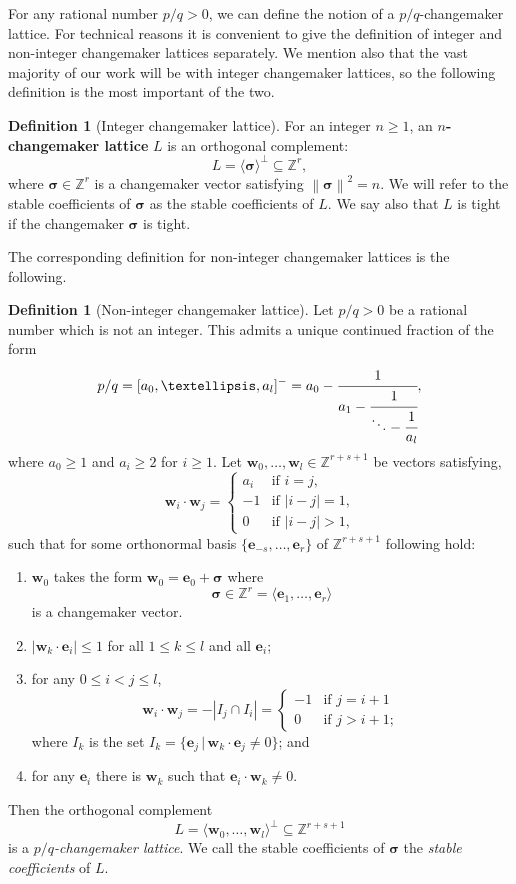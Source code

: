 \documentclass{amsart} %
\newcommand{\Z}{\mathbb{Z}}
\newcommand{\e}{\bm{e}}
\newcommand{\bsigma}{\bm{\sigma}}
\newcommand{\norm}[1]{\left\lVert #1 \right\rVert^2}
\theoremstyle{thm}
\theoremstyle{definition}
\newtheorem{defi}[Theorem]{Definition}
\numberwithin{equation}{section}
\begin{document}
For any rational number $p/q>0$, we can define the notion of a $p/q$-changemaker lattice. For technical reasons it is convenient to give the definition of integer and non-integer changemaker lattices separately. We mention also that the vast majority of our work will be with integer changemaker lattices, so the following definition is the most important of the two.
\begin{defi}[Integer changemaker lattice]\label{def:int_CM_lattice}
For an integer $n\geq 1$, an \textbf{$n$-change\-maker lattice} $L$ is an orthogonal complement:
\[
L=\langle\bsigma\rangle^\bot \subseteq \Z^r,
\]
where $\bsigma\in \Z^r$ is a changemaker vector satisfying $\norm{\bsigma}=n$. We will refer to the stable coefficients of $\bsigma$ as the stable coefficients of $L$. We say also that $L$ is tight if the changemaker $\bsigma$ is tight.
\end{defi}
The corresponding definition for non-integer changemaker lattices is the following.
\begin{defi}[Non-integer changemaker lattice]\label{def:non_int_CM_lattice}
Let $p/q>0$ be a rational number which is not an integer. This admits a unique continued fraction of the form
\[p/q=[a_0, \dots, a_l]^-=
a_0 -
    \cfrac{1}{a_1
        - \cfrac{1}{\ddots
            - \cfrac{1}{a_l} } },\]
where $a_0\geq 1$ and $a_i\geq 2$ for $i\geq 1$. Let $\bm{w}_0, \dots, \bm{w}_l\in \Z^{r+s+1}$ be vectors satisfying,
\[
\bm{w}_i\cdot \bm{w}_j =
\begin{cases}
a_i &\text{if $i=j$,}\\
-1 &\text{if $|i-j|=1$,}\\
0 &\text{if $|i-j|>1$,}
\end{cases}
\]
such that for some orthonormal basis $\{\e_{-s}, \dots, \e_r\}$ of $\Z^{r+s+1}$ following hold:
\begin{enumerate}[label=(\Roman*)]
\item $\bm{w}_0$ takes the form $\bm{w}_0=\e_0+\bsigma$ where
\[
\bsigma\in \Z^r=\langle \e_1, \dots, \e_r\rangle
\]
is a changemaker vector.

\item $|\bm{w}_k\cdot \e_i|\leq 1$ for all $1\leq k\leq l$ and all $\e_i$;
\item for any $0\leq i < j\leq l$,
\[\bm{w}_i\cdot \bm{w}_j = -|I_j \cap I_i|=
\begin{cases}
-1 &\text{if $j=i+1$}\\
0 &\text{if $j>i+1$};
\end{cases}\]
where $I_k$ is the set $I_k=\{\e_j\, | \, \bm{w}_k\cdot \e_j \ne 0\}$; and
\item for any $\e_i$ there is $\bm{w}_k$ such that $\e_i\cdot \bm{w}_k\ne 0$.
\end{enumerate}
Then the orthogonal complement
\[L=\langle \bm{w}_0, \dots, \bm{w}_l \rangle^\bot \subseteq \Z^{r+s+1}\]
is a {\em $p/q$-changemaker lattice}. We call the stable coefficients of $\bsigma$ the {\em stable coefficients} of $L$.
\end{defi}
\end{document}
